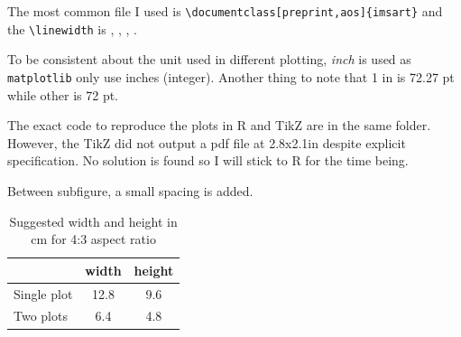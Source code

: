 \documentclass[aos,preprint]{imsart}
\begin{document}
The most common file I used is \verb|\documentclass[preprint,aos]{imsart}|
and the \verb|\linewidth| is \prntlen{\linewidth},
\prntlen{\linewidth}, \prntlen{\linewidth},
\prntlen{\linewidth}.

To be consistent about the unit used in different plotting, \emph{inch} 
is used as \verb|matplotlib| only use inches (integer). 
Another thing to note that 1 in is 72.27 pt while other is 72 pt.

The exact code to reproduce the plots in R and TikZ are in the same folder.
However, the TikZ did not output a pdf file at 2.8x2.1in despite explicit specification.
No solution is found so I will stick to R for the time being.

Between subfigure, a small spacing is added.

\begin{table}[ht]
\centering
\caption{Suggested width and height in cm for 4:3 aspect ratio}
\begin{tabular}{lcc}
\toprule
            & width & height \\
\midrule
Single plot & 12.8  & 9.6    \\
Two plots   & 6.4   & 4.8    \\
\bottomrule
\end{tabular}
\end{table}
\end{document}
